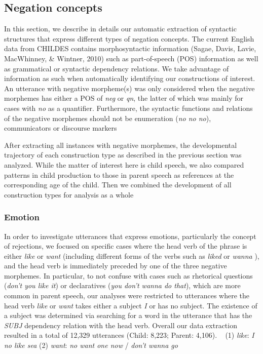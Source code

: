 \documentclass[10pt, letterpaper]{article}
\begin{document}
\hypertarget{negation-concepts}{%
\subsection{Negation concepts}\label{negation-concepts}}

In this section, we describe in details our automatic extraction of
syntactic structures that express different types of negation concepts.
The current English data from CHILDES contains morphosyntactic
information (Sagae, Davis, Lavie, MacWhinney, \& Wintner, 2010) such as
part-of-speech (POS) information as well as grammatical or syntactic
dependency relations. We take advantage of information as such when
automatically identifying our constructions of interest. An utterance
with negative morpheme(s) was only considered when the negative
morphemes has either a POS of \emph{neg} or \emph{qn}, the latter of
which was mainly for cases with \emph{no} as a quantifier. Furthermore,
the syntactic functions and relations of the negative morphemes should
not be enumeration (\emph{no no no}), communicators or discourse markers

After extracting all instances with negative morphemes, the
developmental trajectory of each construction type as described in the
previous section was analyzed. While the matter of interest here is
child speech, we also compared patterns in child production to those in
parent speech as references at the corresponding age of the child. Then
we combined the development of all construction types for analysis as a
whole

\hypertarget{emotion}{%
\subsubsection{Emotion}\label{emotion}}

In order to investigate utterances that express emotions, particularly
the concept of rejections, we focused on specific cases where the head
verb of the phrase is either \emph{like} or \emph{want} (including
different forms of the verbs such as \emph{liked} or \emph{wanna} ), and
the head verb is immediately preceded by one of the three negative
morphemes. In particular, to not confuse with cases such as rhetorical
questions (\emph{don't you like it}) or declaratives (\emph{you don't
wanna do that}), which are more common in parent speech, our analyses
were restricted to utterances where the head verb \emph{like} or
\emph{want} takes either a subject \emph{I} or has no subject. The
existence of a subject was determined via searching for a word in the
utterance that has the \emph{SUBJ} dependency relation with the head
verb. Overall our data extraction resulted in a total of 12,329
utterances (Child: 8,223; Parent: 4,106). ~ (1) \emph{like}: \emph{I no
like sea} (2) \emph{want}: \emph{no want one now} / \emph{don't wanna
go} ~
\end{document}
